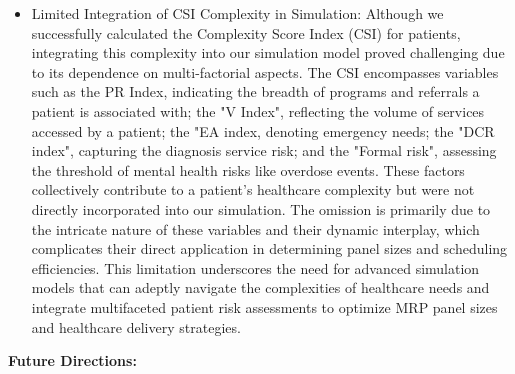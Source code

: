 \documentclass[11pt]{article}
\theoremstyle{definition}
\begin{document}
\begin{itemize}
\item Limited Integration of CSI Complexity in Simulation: Although we successfully calculated the Complexity Score Index (CSI) for patients, integrating this complexity into our simulation model proved challenging due to its dependence on multi-factorial aspects. The CSI encompasses variables such as the PR Index, indicating the breadth of programs and referrals a patient is associated with; the "V Index", reflecting the volume of services accessed by a patient; the "EA index, denoting emergency needs; the "DCR index", capturing the diagnosis service risk; and the "Formal risk", assessing the threshold of mental health risks like overdose events. These factors collectively contribute to a patient's healthcare complexity but were not directly incorporated into our simulation. The omission is primarily due to the intricate nature of these variables and their dynamic interplay, which complicates their direct application in determining panel sizes and scheduling efficiencies. This limitation underscores the need for advanced simulation models that can adeptly navigate the complexities of healthcare needs and integrate multifaceted patient risk assessments to optimize MRP panel sizes and healthcare delivery strategies.
\end{itemize}
\textbf{Future Directions:}
\end{document}
